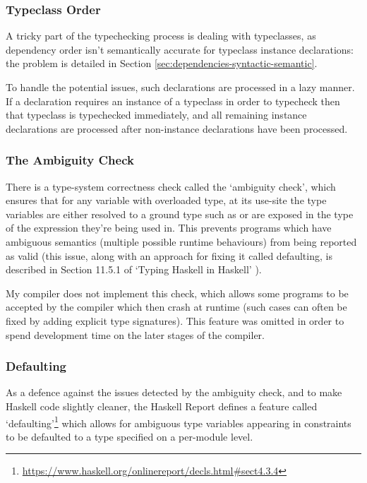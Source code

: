 \documentclass[dissertation.tex]{subfiles}
\begin{document}
{{        \subsubsection{Typeclass Order}
        {
            A tricky part of the typechecking process is dealing with typeclasses, as dependency order isn't semantically accurate for typeclass instance declarations: the problem is detailed in Section \ref{sec:dependencies-syntactic-semantic}.
            
            To handle the potential issues, such declarations are processed in a lazy manner. If a declaration requires an instance of a typeclass in order to typecheck then that typeclass is typechecked immediately, and all remaining instance declarations are processed after non-instance declarations have been processed.
        }
        \subsubsection{The Ambiguity Check}
        {
            There is a type-system correctness check called the `ambiguity check', which ensures that for any variable with overloaded type, at its use-site the type variables are either resolved to a ground type such as  or are exposed in the type of the expression they're being used in. This prevents programs which have ambiguous semantics (multiple possible runtime behaviours) from being reported as valid (this issue, along with an approach for fixing it called defaulting, is described in Section 11.5.1 of `Typing Haskell in Haskell' \cite{THIH}). 

            My compiler does not implement this check, which allows some programs to be accepted by the compiler which then crash at runtime (such cases can often be fixed by adding explicit type signatures). This feature was omitted in order to spend development time on the later stages of the compiler.

        }
        \subsubsection{Defaulting}
        {
            As a defence against the issues detected by the ambiguity check, and to make Haskell code slightly cleaner, the Haskell Report defines a feature called `defaulting'\footnote{\url{https://www.haskell.org/onlinereport/decls.html\#sect4.3.4}} which allows for ambiguous type variables appearing in  constraints to be defaulted to a type specified on a per-module level. 

}}}
\end{document}
